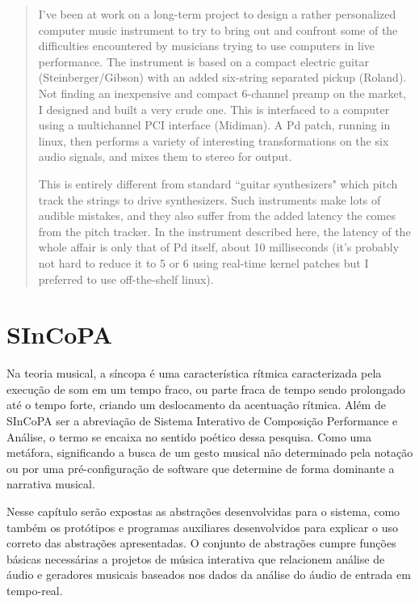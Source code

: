\documentclass[draft]{ppgmus}
\begin{document}
\begin{quote}
 I've been at work on a long-term project to design a rather personalized computer music instrument to try 
to bring out and confront some of the difficulties encountered by musicians trying to use computers in live 
performance. The instrument is based on a compact electric guitar (Steinberger/Gibson) with an added six-string 
separated pickup (Roland). Not finding an inexpensive and compact 6-channel preamp on the market, I designed and 
built a very crude one. This is interfaced to a computer using a multichannel PCI interface (Midiman). 
A Pd patch, running in linux, then performs a variety of interesting transformations on the six audio signals, 
and mixes them to stereo for output.

This is entirely different from standard ``guitar synthesizers" which pitch track the strings to drive synthesizers. 
Such instruments make lots of audible mistakes, and they also suffer from the added latency the comes from the pitch 
tracker. In the instrument described here, the latency of the whole affair is only that of Pd itself, about 10 
milliseconds (it's probably not hard to reduce it to 5 or 6 using real-time kernel patches but I preferred to use 
off-the-shelf linux). 
\end{quote}



\chapter{SInCoPA}
\label{chap:SInCoPA}


Na teoria musical, a síncopa é uma característica rítmica caracterizada pela execução de som em um tempo fraco, 
ou parte fraca de tempo sendo prolongado até o tempo forte, criando um deslocamento da acentuação rítmica. 
Além de SInCoPA ser a abreviação de Sistema Interativo de Composição Performance e Análise, o termo se encaixa
no sentido poético dessa pesquisa. Como uma metáfora, significando a busca de um gesto musical não determinado pela notação
ou por uma pré-configuração de software que determine de forma dominante a narrativa musical.


  Nesse capítulo serão expostas as abstrações desenvolvidas para o sistema, como também
os protótipos e programas auxiliares desenvolvidos para explicar o uso correto das 
abstrações apresentadas. O conjunto de abstrações cumpre funções básicas necessárias
a projetos de música interativa que relacionem análise de áudio e geradores musicais
baseados nos dados da análise do áudio de entrada em tempo-real.
\end{document}
